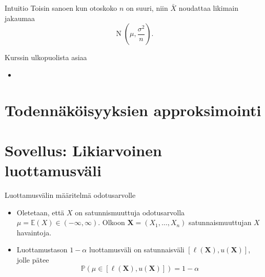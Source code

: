 \documentclass{beamer}
\DeclareMathOperator{\n}{\mathrm N}
\begin{document}


\begin{frame}{Intuitio}
  Toisin sanoen kun otoskoko $n$ on suuri, niin $\bar X$ noudattaa likimain
  jakaumaa
  \begin{equation*}
    \n\left(\mu, \frac{\sigma^2}{n}\right).
  \end{equation*}
\end{frame}


\begin{frame}{Kurssin ulkopuolista asiaa}
  \begin{itemize}
    \item 
  \end{itemize}
\end{frame}


\section{Todennäköisyyksien approksimointi}


\section{Sovellus: Likiarvoinen luottamusväli}


\begin{frame}{Luottamusvälin määritelmä odotusarvolle}
  \begin{itemize}
    \item Oletetaan, että $X$ on satunnismuuttuja odotusarvolla $\mu =
    \mathbb{E}\left(X\right)\in(-\infty, \infty)$. Olkoon $\bm X = (X_1, \ldots,
    X_n)$ satunnaismuuttujan $X$ havaintoja.
    \pause
    \item Luottamustason $1-\alpha$ luottamusväli on satunnaisväli
    $\left[\ell\left(\bm X\right), u\left(\bm X\right)\right]$, jolle pätee
    \begin{equation*}
      \mathbb{P}\left(\mu\in\left[\ell\left(\bm X\right), u\left(\bm
      X\right)\right]\right) = 1 - \alpha
    \end{equation*}
  \end{itemize}
\end{frame}
\end{document}
